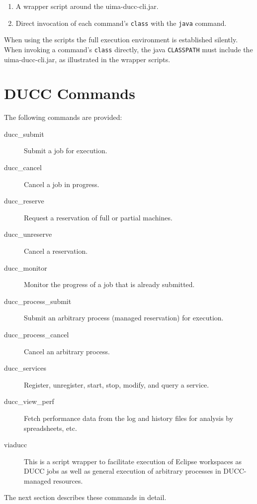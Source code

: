     \begin{enumerate}
      \item A wrapper script around the uima-ducc-cli.jar.
      \item Direct invocation of each command's {\tt class} with the {\tt java} command.
    \end{enumerate}

    When using the scripts the full execution environment is established
    silently.  When invoking a command's {\tt class} directly, the java {\tt CLASSPATH}
    must include the uima-ducc-cli.jar, as illustrated in the wrapper scripts.

    \section{DUCC Commands}
    The following commands are provided:
    \begin{description}
    \item[ducc\_submit] Submit a job for execution.
    \item[ducc\_cancel] Cancel a job in progress.
    \item[ducc\_reserve] Request a reservation of full or partial machines.
    \item[ducc\_unreserve] Cancel a reservation.
    \item[ducc\_monitor] Monitor the progress of a job that is already submitted.
    \item[ducc\_process\_submit] Submit an arbitrary process (managed reservation) for execution.
    \item[ducc\_process\_cancel] Cancel an arbitrary process.
    \item[ducc\_services] Register, unregister, start, stop, modify, and query a service.
    \item[ducc\_view\_perf] Fetch performance data from the log and history files for analysis
      by spreadsheets, etc.
    \item[viaducc] This is a script wrapper to facilitate execution of Eclipse workspaces as
      DUCC jobs as well as general execution of arbitrary processes in DUCC-managed resources.
    \end{description}
    
    The next section describes these commands in detail.

    
    
    
    
    
    
    
    
    


